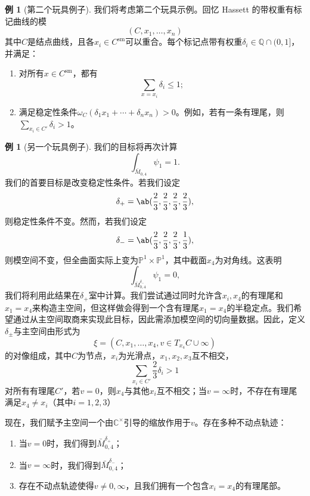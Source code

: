 \documentclass{amsart}
\theoremstyle{definition}
\newtheorem{exm}[thm]{例}
\theoremstyle{remark}
\theoremstyle{plain}
\theoremstyle{definition}
\theoremstyle{remark}
\newcommand{\C}{\mathbb{C}}
\newcommand{\Q}{\mathbb{Q}}
\renewcommand{\P}{\mathbb{P}}
\newcommand{\mr}[1]{\mathrm{#1}}
\newcommand{\1}{\mathbf{1}}
\newcommand{\2}{\mathbf{2}}
\newcommand{\3}{\mathbf{3}}
\begin{document}
\begin{exm}[第二个玩具例子]
我们将考虑第二个玩具示例。回忆 Hassett 的带权重有标记曲线的模
    \[ (C, x_1, \ldots, x_n) \]
其中\(C\)是结点曲线，且各\(x_i \in C^{\mr{sm}}\)可以重合。每个标记点带有权重\(\delta_i \in \Q \cap (0,1]\)，并满足：
    \begin{enumerate}
        \item 对所有\(x \in C^{\mr{sm}}\)，都有
            \[ \sum_{x = x_i} \delta_i \leq 1; \]
        \item 满足稳定性条件\(\omega_C(\delta_1 x_1 + \cdots + \delta_n x_n) > 0\)。例如，若有一条有理尾，则\(\sum_{x_i \in C'} \delta_i > 1\)。
    \end{enumerate}
\end{exm}

\begin{exm}[另一个玩具例子]
我们的目标将再次计算
    \[ \int_{\bar{M}_{0,4}} \psi_1 = 1. \]
我们的首要目标是改变稳定性条件。若我们设定
    \[ \delta_+ = \ab(\frac{2}{3}, \frac{2}{3}, \frac{2}{3}, \frac{2}{3}), \]
则稳定性条件不变。然而，若我们设定
    \[ \delta_- = \ab(\frac{2}{3}, \frac{2}{3}, \frac{2}{3}, \frac{1}{3}), \]
则模空间不变，但全曲面实际上变为\(\P^1 \times \P^1\)，其中截面\(x_4\)为对角线。这表明
    \[ \int_{\bar{M}_{0,4}^{\delta_-}} \psi_1 = 0, \]
我们将利用此结果在\(\delta_+\)室中计算。我们尝试通过同时允许含\(x_i, x_4\)的有理尾和\(x_1 = x_4\)来构造主空间，但这样做会得到一个含有理尾\(x_1 = x_4\)的半稳定点。我们希望通过从主空间取商来实现此目标，因此需添加模空间的切向量数据。因此，定义\(\delta_{\pm}\)与主空间由形式为
    \[ \xi = (C, x_1, \ldots, x_4, v \in T_{x_4} C \cup \infty) \]
的对像组成，其中\(C\)为节点，\(x_i\)为光滑点，\(x_1, x_2, x_3\)互不相交，
    \[ \sum_{x_i \in C'} \frac{2}{3} \delta_i > 1 \]
对所有有理尾\(C'\)，若\(v = 0\)，则\(x_4\)与其他\(x_i\)互不相交；当\(v = \infty\)时，不存在有理尾满足\(x_4 \neq x_i\)（其中\(i = 1,2,3\)）

现在，我们赋予主空间一个由\(\C^{\times}\)引导的缩放作用于\(v\)。存在多种不动点轨迹：
    \begin{enumerate}
        \item 当\(v = 0\)时，我们得到\(\bar{M}_{0,4}^{\delta_+}\)；
        \item 当\(v = \infty\)时，我们得到\(\bar{M}_{0,4}^{\delta_-}\)；
        \item 存在不动点轨迹使得\(v \neq 0,\infty\)，且我们拥有一个包含\(x_i = x_4\)的有理尾部。
    \end{enumerate}


\end{exm}
\end{document}
